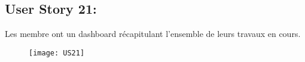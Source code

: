 \newpage
\subsection{User Story 21:}
Les membre ont un dashboard récapitulant l'ensemble de leurs travaux en cours.


\begin{figure}[!h]
  \begin{center}
        \texttt{[image: US21]}
        \label{US21-dia}
  \end{center}
\end{figure}